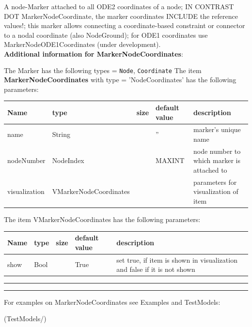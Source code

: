 \label{sec:item:MarkerNodeCoordinates}
A node-Marker attached to all ODE2 coordinates of a node; IN CONTRAST DOT MarkerNodeCoordinate, the marker coordinates INCLUDE the reference values!; this marker allows connecting a coordinate-based constraint or connector to a nodal coordinate (also NodeGround); for ODE1 coordinates use MarkerNodeODE1Coordinates (under development).\vspace{12pt}
 \\{\bf Additional information for MarkerNodeCoordinates}:
\bi
  \item The Marker has the following types = \texttt{Node}, \texttt{Coordinate}
\ei
\vspace{12pt} \noindent The item {\bf MarkerNodeCoordinates} with type = 'NodeCoordinates' has the following parameters:\vspace{-1cm}\\ 
\begin{center}
  \footnotesize
  \begin{longtable}{| p{4.5cm} | p{2.5cm} | p{0.5cm} | p{2.5cm} | p{6cm} |}
    \hline
    \bf Name & \bf type & \bf size & \bf default value & \bf description \\ \hline
    name &     String &      &     '' &     marker's unique name\\ \hline
    nodeNumber &     NodeIndex &      &     MAXINT &     node number to which marker is attached to\\ \hline
    visualization & VMarkerNodeCoordinates & & & parameters for visualization of item \\ \hline
	  \end{longtable}
	\end{center}
The item VMarkerNodeCoordinates has the following parameters:\vspace{-1cm}\\ 
\begin{center}
  \footnotesize
  \begin{longtable}{| p{4.5cm} | p{2.5cm} | p{0.5cm} | p{2.5cm} | p{6cm} |}
    \hline
    \bf Name & \bf type & \bf size & \bf default value & \bf description \\ \hline
    show &     Bool &      &     True &     set true, if item is shown in visualization and false if it is not shown\\ \hline
	  \end{longtable}
	\end{center}
\par\noindent\rule{\textwidth}{0.4pt}
\label{description_MarkerNodeCoordinates}
\vspace{6pt}\par\noindent\rule{\textwidth}{0.4pt}
%
\noindent For examples on MarkerNodeCoordinates see Examples and TestModels:
\bi
\item {} (TestModels/)
\ei

